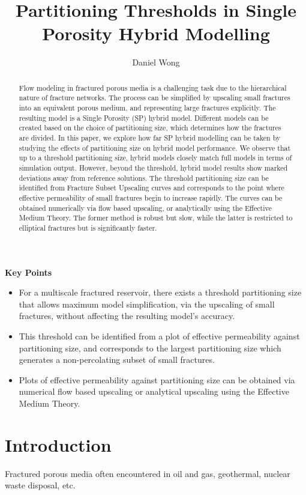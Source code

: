 \documentclass[a4paper]{article}
\title{Partitioning Thresholds in Single Porosity Hybrid Modelling}
\author{Daniel Wong}
\begin{document}
\maketitle

\textbf{Key Points}
\begin{itemize}
	\item For a multiscale fractured reservoir, there exists a threshold partitioning size that allows maximum model simplification, via the upscaling of small fractures, without affecting the resulting model's accuracy.
    \item This threshold can be identified from a plot of effective permeability against partitioning size, and corresponds to the largest partitioning size which generates a non-percolating subset of small fractures.
    \item Plots of effective permeability against partitioning size can be obtained via numerical flow based upscaling or analytical upscaling using the Effective Medium Theory.
\end{itemize}

\begin{abstract}
Flow modeling in fractured porous media is a challenging task due to the hierarchical nature of fracture networks. The process can be simplified by upscaling small fractures into an equivalent porous medium, and representing large fractures explicitly. The resulting model is a Single Porosity (SP) hybrid model. Different models can be created based on the choice of partitioning size, which determines how the fractures are divided. In this paper, we explore how far SP hybrid modelling can be taken by studying the effects of partitioning size on hybrid model performance. We observe that up to a threshold partitioning size, hybrid models closely match full models in terms of simulation output. However, beyond the threshold, hybrid model results show marked deviations away from reference solutions. The threshold partitioning size can be identified from Fracture Subset Upscaling curves and corresponds to the point where effective permeability of small fractures begin to increase rapidly. The curves can be obtained numerically via flow based upscaling, or analytically using the Effective Medium Theory. The former method is robust but slow, while the latter is restricted to elliptical fractures but is significantly faster.
\end{abstract}

\section{Introduction}
Fractured porous media often encountered in oil and gas, geothermal, nuclear waste disposal, etc.
\end{document}

